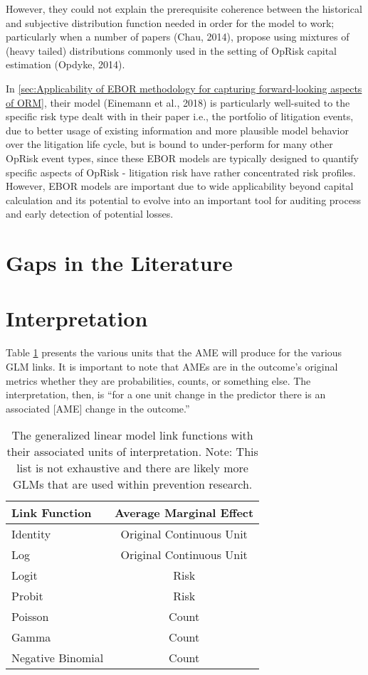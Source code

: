 \documentclass[]{DissertateUSU}
\begin{document}
However, they could not explain the prerequisite coherence between the
historical and subjective distribution function needed in order for the
model to work; particularly when a number of papers (Chau, 2014),
propose using mixtures of (heavy tailed) distributions commonly used in
the setting of OpRisk capital estimation (Opdyke, 2014).\medskip

In
\ref{sec:Applicability of EBOR methodology for capturing forward-looking aspects of ORM},
their model (Einemann et al., 2018) is particularly well-suited to the
specific risk type dealt with in their paper i.e., the portfolio of
litigation events, due to better usage of existing information and more
plausible model behavior over the litigation life cycle, but is bound to
under-perform for many other OpRisk event types, since these EBOR models
are typically designed to quantify specific aspects of OpRisk -
litigation risk have rather concentrated risk profiles. However, EBOR
models are important due to wide applicability beyond capital
calculation and its potential to evolve into an important tool for
auditing process and early detection of potential losses.\medskip

\section{Gaps in the Literature}

\section{Interpretation}\label{interpretation}

Table \ref{tab_int} presents the various units that the AME will produce
for the various GLM links. It is important to note that AMEs are in the
outcome's original metrics whether they are probabilities, counts, or
something else. The interpretation, then, is ``for a one unit change in
the predictor there is an associated {[}AME{]} change in the outcome.''

\begin{table}[tb]
\centering
\caption{The generalized linear model link functions with their associated units of interpretation. Note: This list is not exhaustive and there are likely more GLMs that are used within prevention research.} 
\label{tab_int}
\begin{tabular}{lc}
\toprule
Link Function & Average Marginal Effect \\ 
\midrule
Identity & Original Continuous Unit \\ 
  Log & Original Continuous Unit \\ 
  Logit & Risk \\ 
  Probit & Risk \\ 
  Poisson & Count \\ 
  Gamma & Count \\ 
  Negative Binomial & Count \\ 
\bottomrule
\end{tabular}
\end{table}
\end{document}
